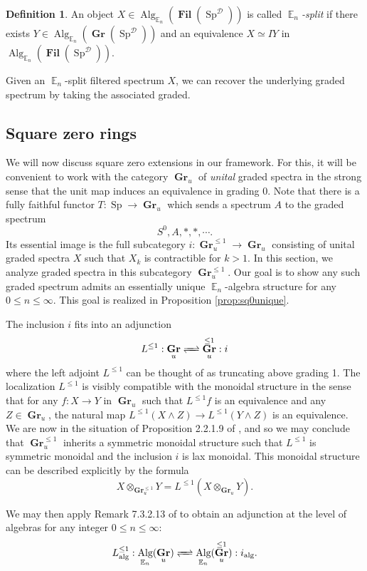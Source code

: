 \documentclass[reqno, oneside]{amsart}
\theoremstyle{definition}
\newtheorem{dfn}[nul]{Definition}
\theoremstyle{plain}
\DeclareMathOperator{\D}{\mathcal{D}}
\DeclareMathOperator{\E}{\mathbb{E}}
\DeclareMathOperator{\Gr}{\textbf{Gr}}
\DeclareMathOperator{\Fil}{\textbf{Fil}}
\DeclareMathOperator{\Alg}{\text{Alg}}
\DeclareMathOperator{\Sp}{\text{Sp}}
\begin{document}
\begin{dfn}
An object $X\in \Alg_{\E_n}(\Fil(\Sp^{\D}))$ is called \emph{$\E_n$-split} if there exists $Y\in \Alg_{\E_n}(\Gr(\Sp^{\D}))$ and an equivalence $X \simeq IY$ in $\Alg_{\E_n}(\Fil(\Sp^{\D}))$.  
\end{dfn}

Given an $\E_n$-split filtered spectrum $X$, we can recover the underlying graded spectrum by taking the associated graded. 

\subsection{Square zero rings}

We will now discuss square zero extensions in our framework.  For this, it will be convenient to work with the category $\Gr_u$ of \emph{unital} graded spectra in the strong sense that the unit map induces an equivalence in grading 0.  
Note that there is a fully faithful functor $T:\Sp \to \Gr_u$ which sends a spectrum $A$ to the graded spectrum $$S^0, A, *, *, \cdots.$$  Its essential image is the full subcategory $i: \Gr^{\leq 1}_u \to \Gr_u$ consisting of unital graded spectra $X$ such that $X_k$ is contractible for $k>1$.  In this section, we analyze graded spectra in this subcategory $\Gr^{\leq 1}_u$. Our goal is to show any such graded spectrum admits an essentially unique $\E_n$-algebra structure for any $0\leq n\leq \infty.$  This goal is realized in Proposition \ref{prop:sq0unique}.  


The inclusion $i$ fits into an adjunction
$$L^{\leq 1}:  \Gr_u \xrightleftharpoons{\quad} \Gr_u^{\leq 1} : i$$ where the left adjoint $L^{\leq 1}$ can be thought of as truncating above grading 1.  The localization $L^{\leq 1}$ is visibly compatible with the monoidal structure in the sense that for any $f:X\to Y$ in $\Gr_u$ such that $L^{\leq 1}f$ is an equivalence and any $Z\in \Gr_u$, the natural map $L^{\leq 1} (X\wedge Z) \to L^{\leq 1}(Y\wedge Z)$ is an equivalence.  We are now in the situation of Proposition 2.2.1.9 of \cite{HA}, and so we may conclude that $\Gr_u^{\leq 1}$ inherits a symmetric monoidal structure such that $L^{\leq 1}$ is symmetric monoidal and the inclusion $i$ is lax monoidal.  This monoidal structure can be described explicitly by the formula $$X \otimes_{\Gr_u^{\leq 1}} Y = L^{\leq 1}(X \otimes_{\Gr_u} Y).$$

We may then apply Remark 7.3.2.13 of \cite{HA} to obtain an adjunction at the level of algebras for any integer $0\leq n\leq \infty$:
$$L^{\leq 1}_{\text{alg}}: \Alg_{\E_n}( \Gr_u)  \xrightleftharpoons{\quad} \Alg_{\E_n}(\Gr_u^{\leq 1}) : i_{\text{alg}}.$$
\end{document}
